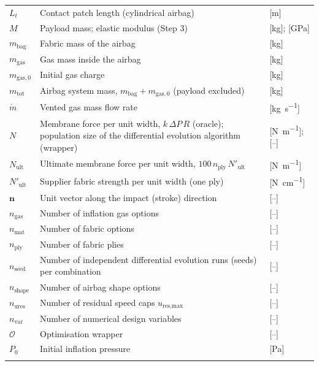 {\begin{longtable}{L{0.16} L{0.64} L{0.20}}
$L_t$ & Contact patch length (cylindrical airbag) & [\si{\metre}] \\
$M$ & Payload mass; elastic modulus (Step 3) & [\si{\kilogram}]; [GPa] \\
$m_\text{bag}$ & Fabric mass of the airbag & [\si{\kilogram}] \\
$m_\text{gas}$ & Gas mass inside the airbag & [\si{\kilogram}] \\
$m_{\text{gas},0}$ & Initial gas charge & [\si{\kilogram}] \\
$m_\text{tot}$ & Airbag system mass, $m_\text{bag} + m_{\text{gas},0}$ (payload excluded) & [\si{\kilogram}] \\
$\dot{m}$ & Vented gas mass flow rate & [\si{\kilogram\per\second}] \\
$N$ & Membrane force per unit width, $k\,\Delta P\,R$ (oracle); population size of the differential evolution algorithm (wrapper) & [\si{\newton\per\metre}]; [--] \\
$N_\text{ult}$ & Ultimate membrane force per unit width, $100\,n_\text{ply}\,N'_\text{ult}$ & [\si{\newton\per\metre}] \\
$N'_\text{ult}$ & Supplier fabric strength per unit width (one ply) & [\si{\newton\per\centi\metre}] \\
$\mathbf{n}$ & Unit vector along the impact (stroke) direction & [--] \\
$n_\text{gas}$ & Number of inflation gas options & [--] \\
$n_\text{mat}$ & Number of fabric options & [--] \\
$n_\text{ply}$ & Number of fabric plies & [--] \\
$n_\text{seed}$ & Number of independent differential evolution runs (seeds) per combination & [--] \\
$n_\text{shape}$ & Number of airbag shape options & [--] \\
$n_\text{ures}$ & Number of residual speed caps $u_\text{res,max}$ & [--] \\
$n_\text{var}$ & Number of numerical design variables & [--] \\
$\mathcal{O}$ & Optimisation wrapper & [--] \\
$P_0$ & Initial inflation pressure & [\si{\pascal}] \\

\end{longtable}}
